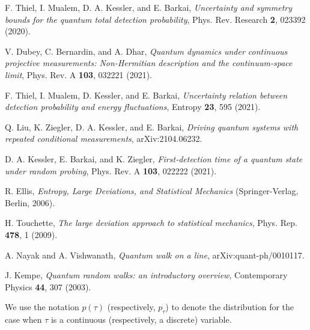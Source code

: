 \documentclass[12pt]{iopart}
\begin{document}
\begin{thebibliography}{99}
F. Thiel, I. Mualem, D. A. Kessler, and E. Barkai, \textit{Uncertainty and symmetry bounds for the quantum total detection probability}, Phys.  Rev.  Research {\bf 2},  023392 (2020).

V. Dubey, C. Bernardin, and A. Dhar, \textit{Quantum dynamics under continuous projective measurements: Non-Hermitian description and the continuum-space limit}, Phys.  Rev.  A {\bf 103},  032221 (2021).

 F. Thiel,  I. Mualem,  D. Kessler, and E. Barkai, \textit{Uncertainty relation between detection probability and energy fluctuations}, Entropy {\bf 23}, 595 (2021).
  
Q. Liu, K. Ziegler, D. A.  Kessler, and  E.  Barkai, \textit{
Driving quantum systems with repeated conditional measurements}, arXiv:2104.06232.

D. A.  Kessler, E. Barkai, and K. Ziegler, \textit{First-detection time of a quantum state under random probing}, Phys.  Rev.  A {\bf 103},  022222 (2021).

  R. Ellis,
  \textit{Entropy, Large Deviations, and Statistical Mechanics}
  (Springer-Verlag, Berlin, 2006).

  H. Touchette, 
  \textit{The large deviation approach to statistical mechanics}, Phys. Rep.
  \textbf{
  478}, 1 (2009).

  A. Nayak and A. Vishwanath, \textit{Quantum walk on a line}, arXiv:quant-ph/0010117.

  J. Kempe, \textit{Quantum random walks: an introductory overview},
  Contemporary Physics \textbf{44}, 307 (2003).

  We use the notation $p(\tau)$ (respectively, $p_\tau$)
  to denote the distribution for the case when $\tau$ is a
  continuous  (respectively, a discrete) variable.
  
\end{thebibliography} 

\appendix

\end{document}
